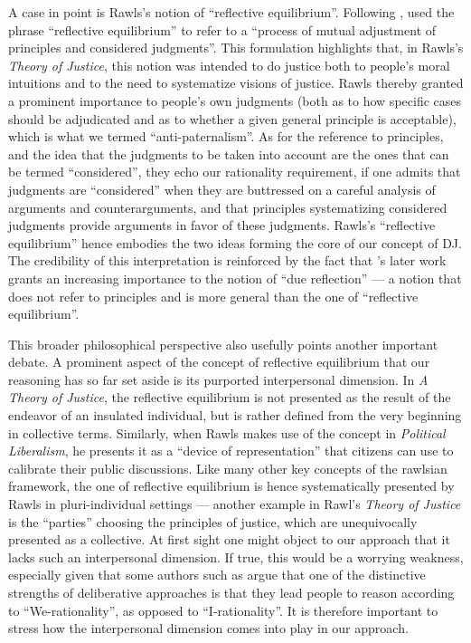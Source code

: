 \documentclass[version=3.21, pagesize, twoside=off, bibliography=totoc, DIV=calc, fontsize=12pt, a4paper, french, english]{scrartcl}
\begin{document}
A case in point is Rawls’s notion of “reflective equilibrium”. 
Following \citet{goodman_fact_1983}, \citet[][p.18]{rawls_theory_1999} used the phrase “reflective equilibrium” to refer to a “process of mutual adjustment of principles and considered judgments”. 
This formulation highlights that, in Rawls's \emph{Theory of Justice}, this notion was intended to do justice both to people's moral intuitions and to the need to systematize visions of justice. 
Rawls thereby granted a prominent importance to people's own judgments (both as to how specific cases should be adjudicated and as to whether a given general principle is acceptable), which is what we termed  “anti-paternalism”. 
As for the reference to principles, and the idea that the judgments to be taken into account are the ones that can be termed “considered”, they echo our rationality requirement, if one admits that judgments are  “considered” when they are buttressed on a careful analysis of arguments and counterarguments, and that principles systematizing considered judgments provide arguments in favor of these judgments. 
Rawls's “reflective equilibrium” hence embodies the two ideas forming the core of our concept of \ac{DJ}. 
The credibility of this interpretation is reinforced by the fact that \citeauthor{rawls_political_2005}’s \citeyearpar{rawls_political_2005} later work grants an increasing importance to the notion of “due reflection” --- a notion that does not refer to principles and is more general than the one of “reflective equilibrium”. 

This broader philosophical perspective also usefully points another important debate. 
A prominent aspect of the concept of reflective equilibrium that our reasoning has so far set aside is its purported interpersonal dimension. 
In \emph{A Theory of Justice}, the reflective equilibrium is not presented as the result of the endeavor of an insulated individual, but is rather defined from the very beginning in collective terms. 
Similarly, when Rawls makes use of the concept in \emph{Political Liberalism}, he presents it as a  “device of representation” that citizens can use to calibrate their public discussions. 
Like many other key concepts of the rawlsian framework, the one of reflective equilibrium is hence systematically presented by Rawls in pluri-individual settings --- another example in Rawl's \emph{Theory of Justice} is the “parties” choosing the principles of justice, which are unequivocally presented as a collective. 
At first sight one might object to our approach that it lacks such an interpersonal dimension.
If true, this would be a worrying weakness, especially given that some authors such as \citet{vatn_institutional_2009} argue that one of the distinctive strengths of deliberative approaches is that they lead people to reason according to ``We-rationality'', as opposed to ``I-rationality''. 
It is therefore important to stress how the interpersonal dimension comes into play in our approach.
\end{document}
